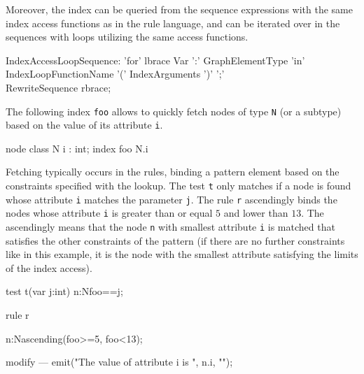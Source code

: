 Moreover, the index can be queried from the sequence expressions with the same index access functions as in the rule language, and can be iterated over in the sequences with loops utilizing the same access functions.

\begin{rail}
  IndexAccessLoopSequence:
    'for' lbrace Var ':' GraphElementType 'in' \\ IndexLoopFunctionName '(' IndexArguments ')' ';' \\ RewriteSequence rbrace;
\end{rail}


\begin{example}\label{ex:indexaccess}
The following index \texttt{foo} allows to quickly fetch nodes of type \texttt{N} (or a subtype) based on the value of its attribute \texttt{i}.

\begin{grgen}
node class N {
  i : int;
}
index foo { N.i }
\end{grgen}

Fetching typically occurs in the rules, binding a pattern element based on the constraints specified with the lookup.
The test \texttt{t} only matches if a node is found whose attribute \texttt{i} matches the parameter \texttt{j}.
The rule \texttt{r} ascendingly binds the nodes whose attribute \texttt{i} is greater than or equal $5$ and lower than $13$.
The ascendingly means that the node \texttt{n} with smallest attribute \texttt{i} is matched that satisfies the other constraints of the pattern (if there are no further constraints like in this example, it is the node with the smallest attribute satisfying the limits of the index access).

\begin{grgen}
test t(var j:int) {
  n:N{foo==j};
}

rule r {
  n:N{ascending(foo>=5, foo<13)};

  modify {
  ---
    emit("The value of attribute i is ", n.i, "\n");
  }
}
\end{grgen}

\end{example}

